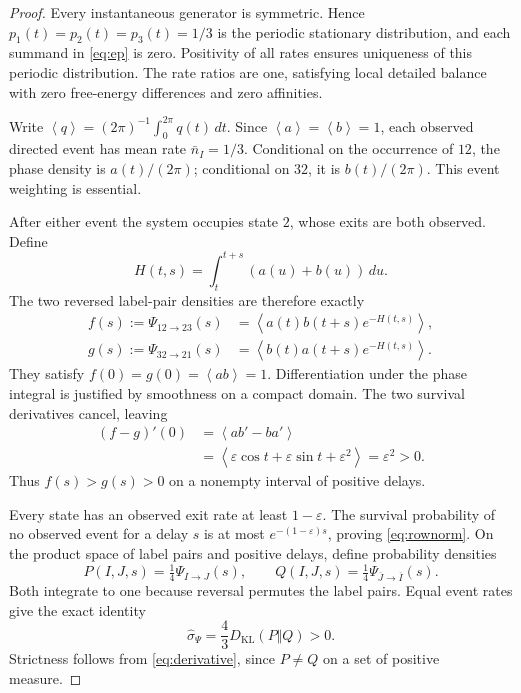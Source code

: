 \documentclass[11pt]{amsart}
\newcommand{\av}[1]{\left\langle #1\right\rangle}
\newcommand{\rev}[1]{\overline{#1}}
\begin{document}
\begin{proof}
Every instantaneous generator is symmetric. Hence
$p_1(t)=p_2(t)=p_3(t)=1/3$ is the periodic stationary distribution,
and each summand in \eqref{eq:ep} is zero. Positivity of all rates
ensures uniqueness of this periodic distribution. The rate ratios are
one, satisfying local detailed balance with zero free-energy differences
and zero affinities.

Write $\av{q}=(2\pi)^{-1}\int_0^{2\pi}q(t)\,dt$. Since
$\av a=\av b=1$, each observed directed event has mean rate
$\bar n_I=1/3$. Conditional on the occurrence of $12$, the phase density
is $a(t)/(2\pi)$; conditional on $32$, it is $b(t)/(2\pi)$.
This event weighting is essential.

After either event the system occupies state $2$, whose exits are both
observed. Define
\begin{equation}\label{eq:survival}
 H(t,s)=\int_t^{t+s}(a(u)+b(u))\,du.
\end{equation}
The two reversed label-pair densities are therefore exactly
\begin{align}\label{eq:fg}
 f(s):=\Psi_{12\to23}(s)&=\av{a(t)b(t+s)e^{-H(t,s)}},\nonumber\\
 g(s):=\Psi_{32\to21}(s)&=\av{b(t)a(t+s)e^{-H(t,s)}}.
\end{align}
They satisfy $f(0)=g(0)=\av{ab}=1$.
Differentiation under the phase integral is justified by smoothness
on a compact domain. The two survival derivatives cancel, leaving
\begin{align}\label{eq:derivative}
 (f-g)'(0)&=\av{ab'-ba'}\nonumber\\
 &=\av{\varepsilon\cos t+\varepsilon\sin t+\varepsilon^2}
 =\varepsilon^2>0.
\end{align}
Thus $f(s)>g(s)>0$ on a nonempty interval of positive delays.

Every state has an observed exit rate at least $1-\varepsilon$.
The survival probability of no observed event for a delay $s$ is at most
$e^{-(1-\varepsilon)s}$, proving \eqref{eq:rownorm}. On the product
space of label pairs and positive delays, define probability densities
\[
 P(I,J,s)=\tfrac14\Psi_{I\to J}(s),\qquad
 Q(I,J,s)=\tfrac14\Psi_{\rev J\to\rev I}(s).
\]
Both integrate to one because reversal permutes the label pairs.
Equal event rates give the exact identity
\begin{equation}\label{eq:kl}
 \widehat\sigma_\Psi=\frac43 D_{\mathrm{KL}}(P\Vert Q)>0.
\end{equation}
Strictness follows from \eqref{eq:derivative}, since $P\ne Q$ on a
set of positive measure.


\end{proof}
\end{document}

